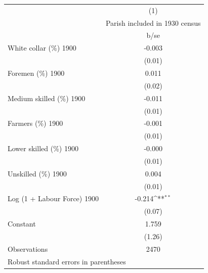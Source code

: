 {
\def\sym#1{\ifmmode^{#1}\else\(^{#1}\)\fi}
\begin{tabular}{l*{1}{c}}
\hline\hline
                    &\multicolumn{1}{c}{(1)}\\
                    &\multicolumn{1}{c}{Parish included in 1930 census}\\
                    &        b/se         \\
\hline
White collar (\%) 1900&      -0.003         \\
                    &      (0.01)         \\
Foremen (\%) 1900   &       0.011         \\
                    &      (0.02)         \\
Medium skilled (\%) 1900&      -0.011         \\
                    &      (0.01)         \\
Farmers (\%) 1900   &      -0.001         \\
                    &      (0.01)         \\
Lower skilled (\%) 1900&      -0.000         \\
                    &      (0.01)         \\
Unskilled (\%) 1900 &       0.004         \\
                    &      (0.01)         \\
Log (1 + Labour Force) 1900&      -0.214\sym{**} \\
                    &      (0.07)         \\
Constant            &       1.759         \\
                    &      (1.26)         \\
\hline
Observations        &        2470         \\
\hline\hline
\multicolumn{2}{l}{\footnotesize Robust standard errors in parentheses}\\
\end{tabular}
}
